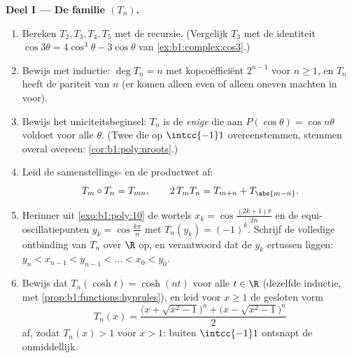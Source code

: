 \begin{problem}
\medskip
\noindent\textbf{Deel I --- De familie $(T_n)$.}
\begin{enumerate}
  \item Bereken $T_2, T_3, T_4, T_5$ met de recursie. (Vergelijk $T_3$
        met de identiteit $\cos3\theta = 4\cos^3\theta - 3\cos\theta$
        van \cref{ex:b1:complex:cos3}.)
  \item Bewijs met inductie: $\deg T_n = n$ met kopcoëfficiënt $2^{n-1}$
        voor $n \geq 1$, en $T_n$ heeft de pariteit van $n$ (er komen
        alleen even of alleen oneven machten in voor).
  \item Bewijs het uniciteitsbeginsel: $T_n$ is de \emph{enige} 
        die aan $P(\cos\theta) = \cos n\theta$ voldoet voor alle
        $\theta$. (Twee  die op $\intcc{-1}1$ overeenstemmen,
        stemmen overal overeen: \cref{cor:b1:poly:nroots}.)
  \item Leid de samenstellings- en de productwet af:
        \[
        T_m \circ T_n = T_{mn},
        \qquad
        2\,T_m T_n = T_{m+n} + T_{\abs{m-n}} .
        \]
  \item Herinner uit \cref{exo:b1:poly:10} de wortels $x_k =
        \cos\frac{(2k+1)\pi}{2n}$ en de equi-oscillatiepunten $y_k =
        \cos\frac{k\pi}n$ met $T_n(y_k) = (-1)^k$. Schrijf de volledige
        ontbinding van $T_n$ over $\R$ op, en verantwoord dat de $y_k$
        ertussen liggen: $y_n < x_{n-1} < y_{n-1} < \dots < x_0 < y_0$.
  \item Bewijs dat $T_n(\cosh t) = \cosh(nt)$ voor alle $t \in \R$
        (dezelfde inductie, met
        \cref{prop:b1:functions:hyprules}), en leid voor $x \geq 1$ de
        gesloten vorm
        \[
        T_n(x) = \frac{\bigl(x + \sqrt{x^2 - 1}\bigr)^n +
        \bigl(x - \sqrt{x^2 - 1}\bigr)^n}{2}
        \]
        af, zodat $T_n(x) > 1$ voor $x > 1$: buiten $\intcc{-1}1$
        ontsnapt de  onmiddellijk.
\end{enumerate}


\end{problem}
